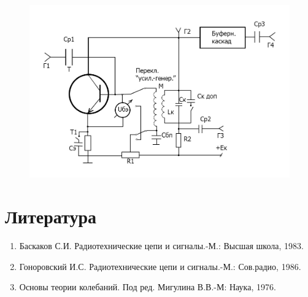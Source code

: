 \begin{figure}
\includegraphics[width=\linewidth]{circuit/fig16}
\caption{}
\label{fig:fig15}
\vspace{-20pt}
\end{figure}

\section{Литература}
\begin{enumerate}
	\item Баскаков С.И. Радиотехнические цепи и сигналы.-М.: Высшая школа, 1983.
	\item Гоноровский И.С. Радиотехнические цепи и сигналы.-М.: Сов.радио, 1986.
	\item Основы теории колебаний. Под ред. Мигулина В.В.-М: Наука, 1976.
\end{enumerate}
